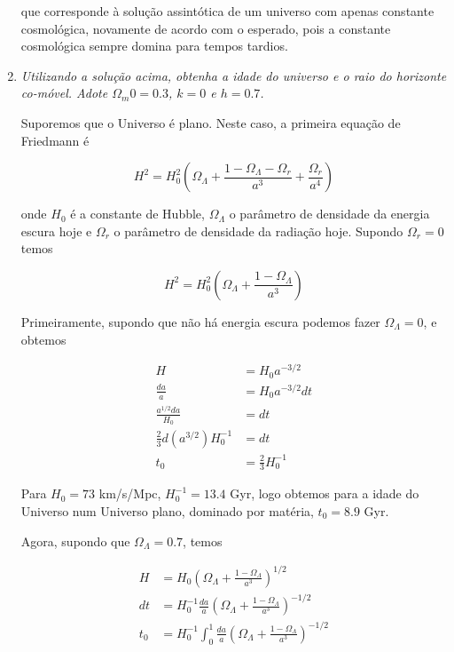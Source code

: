 \documentclass[a4paper, 12pt, notitlepage]{article}
\begin{document}
\begin{enumerate}
\noindent que corresponde à solução assintótica de um universo com apenas constante cosmológica, novamente de acordo com o esperado, pois a constante cosmológica sempre domina para tempos tardios.

\pagebreak

\item \textit{Utilizando a solução acima, obtenha a idade do universo e o raio do horizonte co-móvel. Adote $\Omega_m0 = 0.3$, $k = 0$ e $h = 0.7$.}
\vspace{1cm}

Suporemos que o Universo é plano. Neste caso, a primeira equação de Friedmann é

\begin{equation*}
  H^2 = H_0^2 \left(\Omega_{\Lambda} + \frac{1 - \Omega_{\Lambda} - \Omega_r}{a^3} + \frac{\Omega_r}{a^4}\right)
\end{equation*}

\noindent onde $H_0$ é a constante de Hubble, $\Omega_\Lambda$ o parâmetro de densidade da energia escura hoje e $\Omega_r$ o parâmetro de densidade da radiação hoje. Supondo $\Omega_r = 0$ temos

\begin{equation*}
  H^2 = H_0^2 \left(\Omega_{\Lambda} + \frac{1 - \Omega_{\Lambda}}{a^3}\right)
\end{equation*}

Primeiramente, supondo que não há energia escura podemos fazer $\Omega_\Lambda = 0$, e obtemos

\begin{align*}
  H &= H_0 a^{-3/2} \\
  \frac{da}{a} &= H_0 a^{-3/2} dt \\
  \frac{a^{1/2} da}{H_0} &= dt \\
  \frac{2}{3} d\left( a^{3/2} \right) H_0^{-1} &= dt \\
  t_0 &= \frac{2}{3} H_0^{-1}
\end{align*}

Para $H_0 = 73$ km/s/Mpc, $H_0^{-1} = 13.4$ Gyr, logo obtemos para a idade do Universo num Universo plano, dominado por matéria, $t_0 = 8.9$ Gyr.

Agora, supondo que $\Omega_\Lambda = 0.7$, temos

\begin{align*}
 H &= H_0 \left(\Omega_\Lambda + \frac{1 - \Omega_\Lambda}{a^3}\right)^{1/2} \\
 dt &= H_0^{-1} \frac{da}{a} \left(\Omega_\Lambda + \frac{1 - \Omega_\Lambda}{a^3}\right)^{-1/2} \\
 t_0 &= H_0^{-1} \int_0^1 \frac{da}{a} \left(\Omega_\Lambda + \frac{1 - \Omega_\Lambda}{a^3}\right)^{-1/2}
\end{align*}


\end{enumerate}
\end{document}
